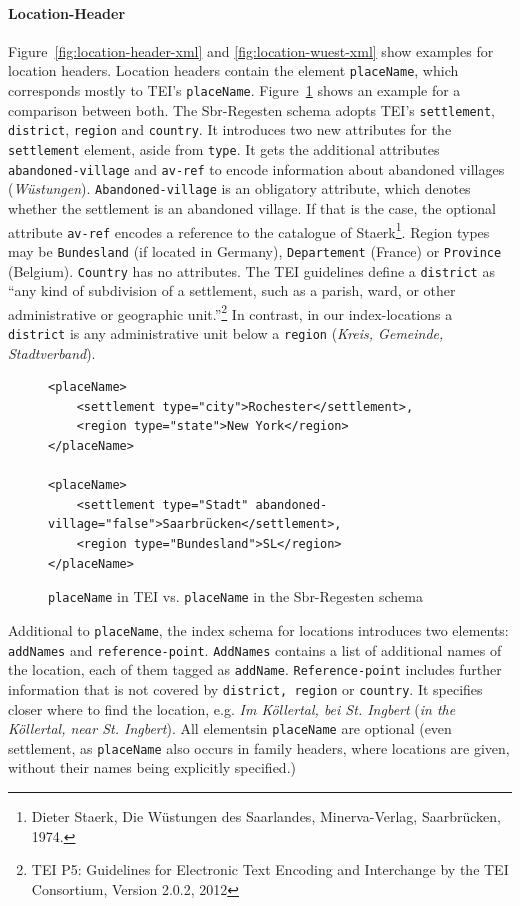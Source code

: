 \paragraph{Location-Header}
\label{sec:location-header}
Figure~\ref{fig:location-header-xml} and \ref{fig:location-wuest-xml} show examples for location headers. Location headers contain the element \texttt{placeName}, which corresponds mostly to TEI's \texttt{placeName}. Figure~\ref{fig:placeName} shows an example for a comparison between both. The Sbr-Regesten schema adopts TEI's \texttt{settlement}, \texttt{district}, \texttt{region} and \texttt{country}. It introduces two new attributes for the \texttt{settlement} element, aside from \texttt{type}. It gets the additional attributes \texttt{abandoned-village} and \texttt{av-ref} to encode information about abandoned villages (\textit{Wüstungen}). \texttt{Abandoned-village} is an obligatory attribute, which denotes whether the settlement is an abandoned village. If that is the case, the optional attribute \texttt{av-ref} encodes a reference to the catalogue of Staerk\footnote{Dieter Staerk, Die Wüstungen des Saarlandes, Minerva-Verlag, Saarbrücken, 1974.}. Region types may be \texttt{Bundesland} (if located in Germany), \texttt{Departement} (France) or \texttt{Province} (Belgium). \texttt{Country} has no attributes. The TEI guidelines define a \texttt{district} as “any kind of subdivision of a settlement, such as a parish, ward, or other administrative or geographic unit.”\footnote{TEI P5: Guidelines for Electronic Text Encoding and Interchange by the TEI Consortium, Version 2.0.2, 2012} In contrast, in our index-locations a \texttt{district} is any administrative unit below a \texttt{region} (\textit{Kreis, Gemeinde, Stadtverband}).

\begin{figure}[H]
\centering
\begin{verbatim}
<placeName>
    <settlement type="city">Rochester</settlement>,
    <region type="state">New York</region>
</placeName>

<placeName>
    <settlement type="Stadt" abandoned-village="false">Saarbrücken</settlement>,
    <region type="Bundesland">SL</region>
</placeName>
\end{verbatim}
\caption{\texttt{placeName} in TEI vs. \texttt{placeName} in the Sbr-Regesten schema}
\label{fig:placeName}
\end{figure}

Additional to \texttt{placeName}, the index schema for locations introduces two elements: \texttt{addNames} and \texttt{reference-point}. \texttt{AddNames} contains a list of additional names of the location, each of them tagged as \texttt{addName}. \texttt{Reference-point} includes further information that is not covered by \texttt{district, region} or \texttt{country}. It specifies closer where to find the location, e.g. \textit{Im Köllertal, bei St. Ingbert} (\textit{in the Köllertal, near St. Ingbert}). All elementsin \texttt{placeName} are optional (even settlement, as \texttt{placeName} also occurs in family headers, where locations are given, without their names being explicitly specified.)   

